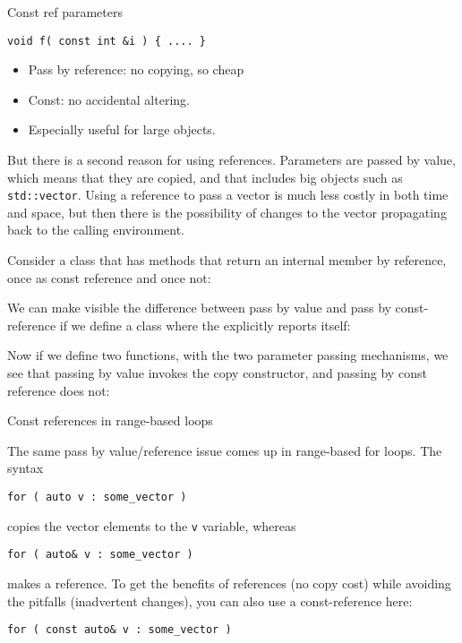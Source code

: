 \begin{slide}{Const ref parameters}
  \label{sl:const-ref}
\begin{lstlisting}
void f( const int &i ) { .... }
\end{lstlisting}
\begin{itemize}
\item Pass by reference: no copying, so cheap
\item Const: no accidental altering.
\item Especially useful for large objects.
\end{itemize}

\end{slide}

But there is a second reason for using references. Parameters are
passed by value, which means that they are copied, and that includes
big objects such as \lstinline{std::vector}. Using a reference to pass a
vector is much less costly in both time and space, but then there is the
possibility of changes to the vector propagating back to the calling
environment.

Consider a class that has methods that return an internal member by
reference, once as const reference and once not:
%

We can make visible the difference between pass by value and pass by
const-reference if we define a class where the
 explicitly reports itself:
%
  
Now if we define two functions, with the two parameter passing
mechanisms, we see that passing by value invokes the copy constructor,
and passing by const reference does not:
%

 {Const references in range-based loops}

The same pass by value/reference issue comes up in range-based for
loops. The syntax
\begin{lstlisting}
for ( auto v : some_vector )
\end{lstlisting}
copies the vector elements to the \lstinline{v} variable, whereas
\begin{lstlisting}
for ( auto& v : some_vector )
\end{lstlisting}
makes a reference. To get the benefits of references (no copy cost)
while avoiding the pitfalls (inadvertent changes), you can also use a
const-reference here:
\begin{lstlisting}
for ( const auto& v : some_vector )
\end{lstlisting}

